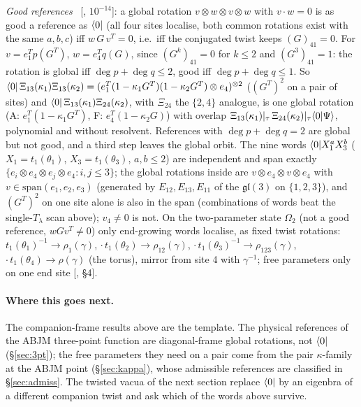 \emph{Good references} \npy\ [, $10^{-14}$]: a global rotation $v\otimes w\otimes v\otimes w$ with $v\cdot w=0$ is as good a reference as $\langle0|$
(all four sites localise, both common rotations exist with the same $a,b,c$) iff $w\,G\,v^T=0$, i.e.\ iff the conjugated twist keeps $(G)_{41}=0$.
For $v=e_1^Tp(G^T)$, $w=e_4^Tq(G)$, since $(G^k)_{41}=0$ for $k\le2$ and $(G^3)_{41}=1$: the rotation is global iff $\deg p+\deg q\le2$, good iff $\deg p+\deg q\le1$.
So $\langle0|\,\Xi_{13}(\kappa_1)\Xi_{13}(\kappa_2)=(e_1^T(1-\kappa_1G^T)(1-\kappa_2G^T)\otimes e_4)^{\otimes2}$ ($(G^T)^2$ on a pair of sites) and
$\langle0|\,\Xi_{13}(\kappa_1)\Xi_{24}(\kappa_2)$, with $\Xi_{24}$ the $\{2,4\}$ analogue, is one global rotation (A: $e_1^T(1-\kappa_1G^T)$, F: $e_4^T(1-\kappa_2G)$) with overlap
$\Xi_{13}(\kappa_1)|_\tau\,\Xi_{24}(\kappa_2)|_\tau\langle0|\Psi\rangle$,
polynomial and without resolvent. References with $\deg p+\deg q=2$ are global but not good, and a third step leaves the global orbit. The nine words $\langle0|X_1^aX_3^b$
($X_1=t_1(\theta_1)$, $X_3=t_1(\theta_3)$, $a,b\le2$) are independent and span exactly $\{e_i\otimes e_4\otimes e_j\otimes e_4:i,j\le3\}$; the global rotations inside are
$v\otimes e_4\otimes v\otimes e_4$ with $v\in\mathrm{span}(e_1,e_2,e_3)$ (generated by $E_{12},E_{13},E_{11}$ of the $\mathfrak{gl}(3)$ on $\{1,2,3\}$), and $(G^T)^2$ on one site
alone is also in the span (combinations of words beat the single-$T_\lambda$ scan above); $v_4\ne0$ is not. On the two-parameter state $\Omega_2$ (not a good reference, $wGv^T\neq0$)
only end-growing words localise, as fixed twist rotations: $t_1(\theta_1)^{-1}\to\rho_1(\gamma)$, $\cdot\,t_1(\theta_2)\to\rho_{12}(\gamma)$,
$\cdot\,t_1(\theta_3)^{-1}\to\rho_{123}(\gamma)$, $\cdot\,t_1(\theta_4)\to\rho(\gamma)$ (the torus), mirror from site 4 with $\gamma^{-1}$; free parameters only on one end site
[,  \S4].

\paragraph{Where this goes next.} The companion-frame results above are the template. The physical references of the ABJM three-point
function are diagonal-frame global rotations, not $\langle0|$ (\S\ref{sec:3pt}); the free parameters they need on a pair come from the pair
$\kappa$-family at the ABJM point (\S\ref{sec:kappa}), whose admissible references are classified in \S\ref{sec:admiss}. The twisted vacua of the
next section replace $\langle0|$ by an eigenbra of a different companion twist and ask which of the words above survive.

